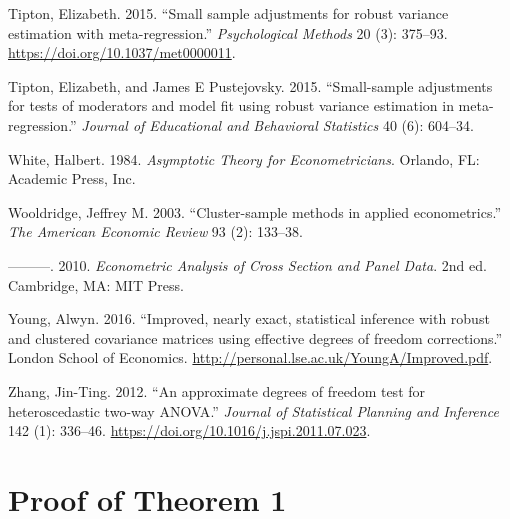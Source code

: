 \documentclass[12pt]{article}
\newlength{\cslhangindent}
\newlength{\cslentryspacingunit} %
\newenvironment{CSLReferences}[2] %
 {%
  \setlength{\parindent}{0pt}
  \ifodd #1
  \let\oldpar\par
  \def\par{\hangindent=\cslhangindent\oldpar}
  \fi
  \setlength{\parskip}{#2\cslentryspacingunit}
 }%
 {}
\begin{document}
\begin{CSLReferences}{1}{0}
\leavevmode{}%
Tipton, Elizabeth. 2015. {``{Small sample adjustments for robust
variance estimation with meta-regression.}''} \emph{Psychological
Methods} 20 (3): 375--93. \url{https://doi.org/10.1037/met0000011}.

\leavevmode{}%
Tipton, Elizabeth, and James E Pustejovsky. 2015. {``{Small-sample
adjustments for tests of moderators and model fit using robust variance
estimation in meta-regression}.''} \emph{Journal of Educational and
Behavioral Statistics} 40 (6): 604--34.

\leavevmode{}%
White, Halbert. 1984. \emph{Asymptotic Theory for Econometricians}.
Orlando, FL: Academic Press, Inc.

\leavevmode{}%
Wooldridge, Jeffrey M. 2003. {``{Cluster-sample methods in applied
econometrics}.''} \emph{The American Economic Review} 93 (2): 133--38.

\leavevmode{}%
---------. 2010. \emph{{Econometric Analysis of Cross Section and Panel
Data}}. 2nd ed. Cambridge, MA: MIT Press.

\leavevmode{}%
Young, Alwyn. 2016. {``{Improved, nearly exact, statistical inference
with robust and clustered covariance matrices using effective degrees of
freedom corrections}.''} London School of Economics.
\url{http://personal.lse.ac.uk/YoungA/Improved.pdf}.

\leavevmode{}%
Zhang, Jin-Ting. 2012. {``{An approximate degrees of freedom test for
heteroscedastic two-way ANOVA}.''} \emph{Journal of Statistical Planning
and Inference} 142 (1): 336--46.
\url{https://doi.org/10.1016/j.jspi.2011.07.023}.

\end{CSLReferences}

\newpage

\renewcommand{\thesection}{Appendix \Alph{section}}
\renewcommand{\thesubsection}{\Alph{section}.\arabic{subsection}}
\setcounter{section}{0}
\setcounter{table}{0}
\setcounter{figure}{0}
\setcounter{equation}{0}
\renewcommand{\thefigure}{A\arabic{figure}}
\renewcommand{\thetable}{A\arabic{table}}
\renewcommand{\theequation}{A\arabic{equation}}

\hypertarget{app:proof1}{%
\section{Proof of Theorem 1}\label{app:proof1}}
\end{document}
